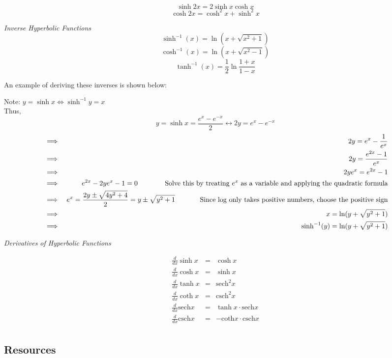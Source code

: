 \documentclass{article}
\begin{document}
$$\sinh{2x} = 2 \sinh x \cosh x$$
$$\cosh{2x} = \cosh^2 x + \sinh^2 x$$

\noindent\textit{Inverse Hyperbolic Functions}
$$\sinh^{-1}(x) = \ln (x+\sqrt{x^2 + 1})$$
$$\cosh^{-1}(x) = \ln (x+\sqrt{x^2 - 1})$$
$$\tanh^{-1}(x) = \frac{1}{2}\ln \frac{1+x}{1-x}$$

\noindent An example of deriving these inverses is shown below:

\noindent Note: $y = \sinh x \Longleftrightarrow \sinh^{-1} y = x$\\

Thus, 
$$y = \sinh x = \frac{e^x - e^{-x}}{2} \longleftrightarrow 2y = e^x - e^{-x}$$
\begin{eqnarray*}
    &\implies& 2y = e^x - \frac{1}{e^x} \\
    &\implies& 2y = \frac{e^{2x} - 1}{e^x}\\
    &\implies& 2ye^x = e^{2x} - 1 \\
    &\implies& e^{2x} - 2ye^x - 1 = 0 \hspace{0.5in} \text{ Solve this by treating $e^x$ as a variable and applying the quadratic formula}\\
    &\implies& e^x = \frac{2y \pm \sqrt{4y^2 +4}}{2}  = y \pm \sqrt{y^2 + 1} \hspace{0.5in} \text{Since log only takes positive numbers, choose the positive sign}\\
    &\implies& x = \ln (y + \sqrt{y^2 + 1})\\
    &\implies& \sinh^{-1}(y) = \ln(y+\sqrt{y^2 + 1})
\end{eqnarray*}

\vspace{0.2in}
\noindent\textit{Derivatives of Hyperbolic Functions}

\begin{eqnarray*}
    \frac{d}{dx} \sinh x &=& \cosh x \\
    \frac{d}{dx} \cosh x &=& \sinh x \\
    \frac{d}{dx} \tanh x &=& \text{sech}^2 x \\
    \frac{d}{dx} \coth x &=& \text{csch}^2 x \\
    \frac{d}{dx} \text{sech} x &=& \tanh x \cdot \text{sech} x \\
    \frac{d}{dx} \text{csch} x &=& -\text{coth} x \cdot \text{csch} x\\
\end{eqnarray*}

\subsection*{Resources}
\end{document}
